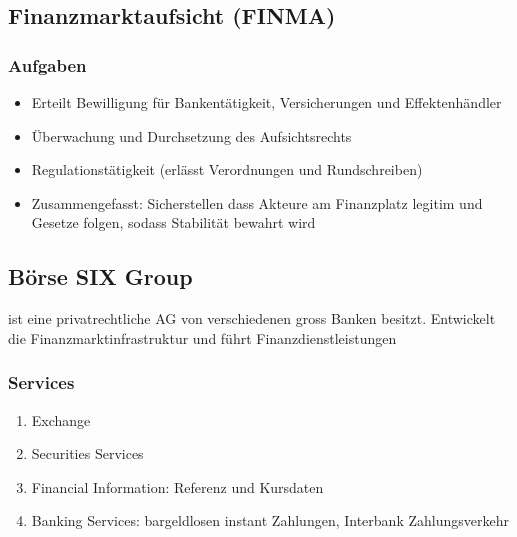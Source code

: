 
\subsection{Finanzmarktaufsicht (FINMA)}

\subsubsection{Aufgaben}

\begin{itemize}
    \item Erteilt Bewilligung für Bankentätigkeit,
    Versicherungen und Effektenhändler
    \item Überwachung und Durchsetzung des Aufsichtsrechts
    \item Regulationstätigkeit (erlässt Verordnungen und
    Rundschreiben)
    \item Zusammengefasst: Sicherstellen dass Akteure am
    Finanzplatz legitim und Gesetze folgen, sodass Stabilität
    bewahrt wird
\end{itemize}

\subsection{Börse SIX Group}
\begin{definition}
     ist eine
    privatrechtliche AG von verschiedenen gross Banken besitzt. Entwickelt die
    Finanzmarktinfrastruktur und führt Finanzdienstleistungen
\end{definition}

\subsubsection{Services}
\begin{enumerate}
    \item Exchange
    \item Securities Services
    \item Financial Information: Referenz und Kursdaten
    \item Banking Services: bargeldlosen instant Zahlungen,
    Interbank Zahlungsverkehr 
\end{enumerate}

